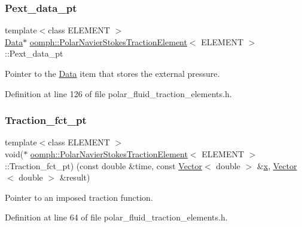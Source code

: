 \subsubsection{\texorpdfstring{Pext\+\_\+data\+\_\+pt}{Pext\_data\_pt}}
{\footnotesize\ttfamily template$<$class E\+L\+E\+M\+E\+NT $>$ \\
\hyperlink{classoomph_1_1Data}{Data}$\ast$ \hyperlink{classoomph_1_1PolarNavierStokesTractionElement}{oomph\+::\+Polar\+Navier\+Stokes\+Traction\+Element}$<$ E\+L\+E\+M\+E\+NT $>$\+::Pext\+\_\+data\+\_\+pt\hspace{0.3cm}{\ttfamily [protected]}}



Pointer to the \hyperlink{classoomph_1_1Data}{Data} item that stores the external pressure. 



Definition at line 126 of file polar\+\_\+fluid\+\_\+traction\+\_\+elements.\+h.

\mbox{\label{classoomph_1_1PolarNavierStokesTractionElement_a6ed7d56215a72c40a48ddba355de0fb5}} 
\subsubsection{\texorpdfstring{Traction\+\_\+fct\+\_\+pt}{Traction\_fct\_pt}}
{\footnotesize\ttfamily template$<$class E\+L\+E\+M\+E\+NT $>$ \\
void($\ast$ \hyperlink{classoomph_1_1PolarNavierStokesTractionElement}{oomph\+::\+Polar\+Navier\+Stokes\+Traction\+Element}$<$ E\+L\+E\+M\+E\+NT $>$\+::Traction\+\_\+fct\+\_\+pt) (const double \&time, const \hyperlink{classoomph_1_1Vector}{Vector}$<$ double $>$ \&\hyperlink{classoomph_1_1PolarNavierStokesTractionElement_a9c89a9bed61686e2fb60717f133f8f02}{x}, \hyperlink{classoomph_1_1Vector}{Vector}$<$ double $>$ \&result)\hspace{0.3cm}{\ttfamily [private]}}



Pointer to an imposed traction function. 



Definition at line 64 of file polar\+\_\+fluid\+\_\+traction\+\_\+elements.\+h.



